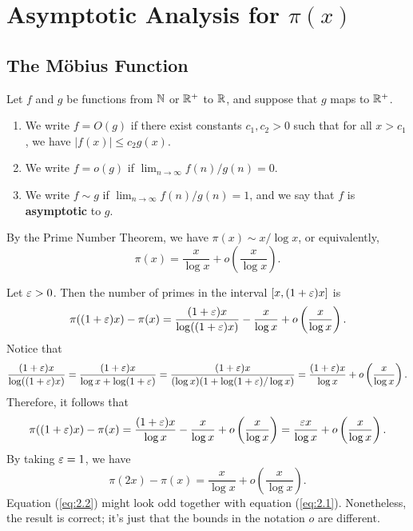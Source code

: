 \section{Asymptotic Analysis for $\pi(x)$}\label{sec:2}

\subsection{The M\"obius Function}\label{subsec:2.1}

\begin{defn}\label{def:2.1}
Let $f$ and $g$ be functions from $\mathbb{N}$ or $\mathbb{R}^+$ to $\mathbb{R}$, and suppose that $g$ maps to $\mathbb{R}^+$. 
\begin{enumerate}[(1)]
    \item We write $f = O(g)$ if there exist constants $c_1, c_2 > 0$ such that for all $x > c_1$, 
    we have $|f(x)| \leq c_2 g(x)$. 
    \item We write $f = o(g)$ if $\lim_{n\to\infty} f(n)/g(n) = 0$. 
    \item We write $f \sim g$ if $\lim_{n\to\infty} f(n)/g(n) = 1$, and we say that $f$ is 
    {\bf asymptotic} to $g$. 
\end{enumerate}
\end{defn}

By the Prime Number Theorem, we have $\pi(x) \sim x/\log x$, or equivalently, 
\begin{equation}
    \pi(x) = \frac{x}{\log x} + o\left( \frac{x}{\log x} \right). \label{eq:2.1}
\end{equation}
\begin{remark}\label{remark:2.2}
Let $\varepsilon > 0$. Then the number of primes in the interval $[x, (1+\varepsilon)x]$ is 
\[ \pi((1+\varepsilon)x) - \pi(x) = \frac{(1+\varepsilon)x}{\log((1+\varepsilon)x)} - \frac{x}{\log x} + o\left( \frac{x}{\log x} \right). \]
Notice that 
\[ \frac{(1+\varepsilon)x}{\log((1+\varepsilon)x)} = \frac{(1+\varepsilon)x}{\log x + \log(1+\varepsilon)} 
= \frac{(1+\varepsilon)x}{(\log x)(1 + \log(1+\varepsilon)/\log x)} = \frac{(1+\varepsilon)x}{\log x} + o\left( \frac{x}{\log x} \right). \]
Therefore, it follows that 
\[ \pi((1+\varepsilon)x) - \pi(x) = \frac{(1+\varepsilon)x}{\log x} - \frac{x}{\log x} + o\left( \frac{x}{\log x} \right) = \frac{\varepsilon x}{\log x} + o\left( \frac{x}{\log x} \right). \]
By taking $\varepsilon = 1$, we have 
\begin{equation}
    \pi(2x) - \pi(x) = \frac{x}{\log x} + o\left( \frac{x}{\log x} \right). \label{eq:2.2}
\end{equation} 
Equation (\ref{eq:2.2}) might look odd together with equation (\ref{eq:2.1}). Nonetheless, the result is 
correct; it's just that the bounds in the notation $o$ are different. 
\end{remark}

